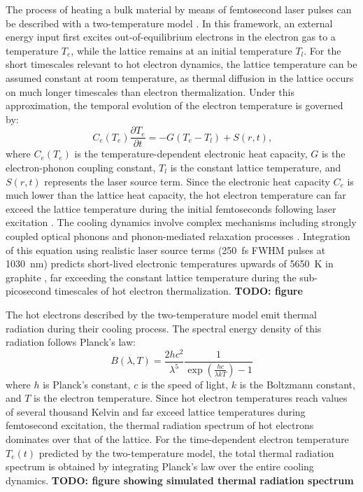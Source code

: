 \documentclass[
	parskip=half,
	a4paper,
]{scrarticle}
\begin{document}
The process of heating a bulk material by means of femtosecond laser pulses can be described with a two-temperature model \cite{roob_thermal_2025}. In this framework, an external energy input first excites out-of-equilibrium electrons in the electron gas to a temperature $T_e$, while the lattice remains at an initial temperature $T_l$. For the short timescales relevant to hot electron dynamics, the lattice temperature can be assumed constant at room temperature, as thermal diffusion in the lattice occurs on much longer timescales than electron thermalization. Under this approximation, the temporal evolution of the electron temperature is governed by:
\begin{equation}
C_e(T_e) \frac{\partial T_e}{\partial t} = -G(T_e - T_l) + S(r,t)\text{,}
\end{equation}
where $C_e(T_e)$ is the temperature-dependent electronic heat capacity, $G$ is the electron-phonon coupling constant, $T_l$ is the constant lattice temperature, and $S(r,t)$ represents the laser source term. Since the electronic heat capacity $C_e$ is much lower than the lattice heat capacity, the hot electron temperature can far exceed the lattice temperature during the initial femtoseconds following laser excitation \cite{nihira_temperature_2003}. The cooling dynamics involve complex mechanisms including strongly coupled optical phonons \cite{kampfrath_strongly_2005} and phonon-mediated relaxation processes \cite{stange_hot_2015}. Integration of this equation using realistic laser source terms (\SI{250}{fs} FWHM pulses at \SI{1030}{nm}) predicts short-lived electronic temperatures upwards of \SI{5650}{K} in graphite \cite{roob_thermal_2025}, far exceeding the constant lattice temperature during the sub-picosecond timescales of hot electron thermalization.
\textbf{TODO: figure}

The hot electrons described by the two-temperature model emit thermal radiation during their cooling process. The spectral energy density of this radiation follows Planck's law:
\begin{equation}
B(\lambda, T) = \frac{2hc^2}{\lambda^5} \frac{1}{\exp\left(\frac{hc}{\lambda kT}\right) - 1}
\end{equation}
where $h$ is Planck's constant, $c$ is the speed of light, $k$ is the Boltzmann constant, and $T$ is the electron temperature. Since hot electron temperatures reach values of several thousand Kelvin and far exceed lattice temperatures during femtosecond excitation, the thermal radiation spectrum of hot electrons dominates over that of the lattice. For the time-dependent electron temperature $T_e(t)$ predicted by the two-temperature model, the total thermal radiation spectrum is obtained by integrating Planck's law over the entire cooling dynamics. 
\textbf{TODO: figure showing simulated thermal radiation spectrum}
\end{document}
